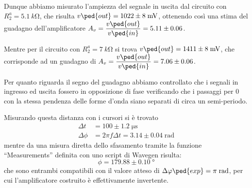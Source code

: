 \documentclass[10pt, a4paper, italian]{article}
\begin{document}
Dunque abbiamo misurato l'ampiezza del segnale in uscita dal circuito con
$R_2^a = \SI{5.1}{k\ohm}$, che risulta $v\ped{out} = 1022 \pm 8 \; \si{m\V}$,
ottenendo così una stima del guadagno dell'amplificatore
$A_v = \dfrac{v\ped{out}}{v\ped{in}} = 5.11 \pm 0.06 $.

Mentre per il circuito con $R_2^a = \SI{7}{k\ohm}$ si trova
$v\ped{out} = 1411 \pm 8 \; \si{m\V}$, che corrisponde ad un guadagno di
$A_v = \dfrac{v\ped{out}}{v\ped{in}} = 7.06 \pm 0.06$.

Per quanto riguarda il segno del guadagno abbiamo controllato che i segnali in
ingresso ed uscita fossero in opposizione di fase verificando che i passaggi
per 0 con la stessa pendenza delle forme d'onda siano separati di circa un
semi-periodo.

Misurando questa distanza con i cursori si è trovato
\begin{align*}
\Delta t &= 100 \pm 1.2 \; \si{\micro\s}\\
\Delta \phi &= 2\pi f \Delta t = 3.14 \pm 0.04 \; \si{\radian}
\end{align*}
mentre da una misura diretta dello sfasamento tramite la funzione
``Measurements'' definita con uno script di Wavegen risulta:
\[
\phi = 179.88 \pm 0.10 \; \si{\degree}
\]
che sono entrambi compatibili con il valore atteso di $\Delta \phi\ped{exp}
= \pi \; \si{\radian}$, per cui l'amplificatore costruito è effettivamente
invertente.
\end{document}
